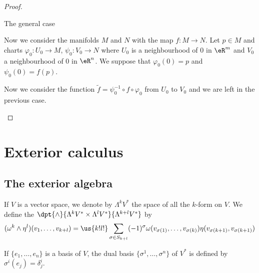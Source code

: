 \begin{proof}
\begin{subproof}
        \item[The general case]

            Now we consider the manifolds \( M\) and \( N\) with the map \( f\colon M\to N\). Let \( p\in M\) and charts \( \varphi_0\colon U_0\to M\), \( \psi_0\colon V_0\to N\) where \( U_0\) is a neighbourhood of \( 0\) in \( \eR^m\) and \( V_0\) a neighbourhood of \( 0\) in \( \eR^n\). We suppose that \( \varphi_0(0)=p\) and \( \psi_0(0)=f(p)\).

            Now we consider the function \( \tilde f=\psi_0^{-1}\circ f\circ \varphi_0\) from \( U_0\) to \( V_0\) and we are left in the previous case.
    \end{subproof}
\end{proof}

\section{Exterior calculus}

\subsection{The exterior algebra}

\begin{definition}
    If $V$ is a vector space, we denote by $\Lambda^kV^*$ the space of all the $k$-form on $V$. We define the  $\dpt{\wedge}{\Lambda^kV^*\times\Lambda^lV^*}{\Lambda^{k+l}V^*}$ by
    \begin{equation}
      (\omega^k\wedge\eta^l)(v_1,\ldots,v_{k+l})
      =\us{k!l!}\sum_{\sigma\in S_{k+l}} (-1)^{\sigma}   \omega(v_{\sigma(1)},\ldots,v_{\sigma(k)})\eta(v_{\sigma(k+1)},v_{\sigma(k+1)})
    \end{equation}
\end{definition}
If $\{e_1,\ldots,e_n\}$ is a basis of $V$, the dual basis $\{\sigma^1,\ldots,\sigma^n\}$ of $V^*$ is defined by $\sigma^i(e_j)=\delta^i_j$.

